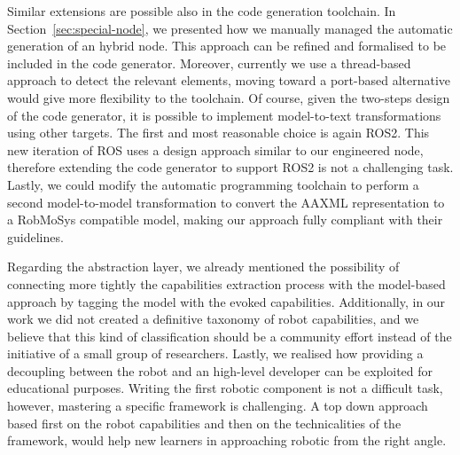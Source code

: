Similar extensions are possible also in the code generation toolchain. In Section~\ref{sec:special-node}, we presented how we manually managed the automatic generation of an hybrid node. This approach can be refined and formalised to be included in the code generator. Moreover, currently we use a thread-based approach to detect the relevant elements, moving toward a port-based alternative would give more flexibility to the toolchain. Of course, given the two-steps design of the code generator, it is possible to implement model-to-text transformations using other targets. The first and most reasonable choice is again ROS2. This new iteration of ROS uses a design approach similar to our engineered node, therefore extending the code generator to support ROS2 is not a challenging task. Lastly, we could modify the automatic programming toolchain to perform a second model-to-model transformation to convert the AAXML representation to a RobMoSys compatible model, making our approach fully compliant with their guidelines.

Regarding the abstraction layer, we already mentioned the possibility of connecting more tightly the capabilities extraction process with the model-based approach by tagging the model with the evoked capabilities. Additionally, in our work we did not created a definitive taxonomy of robot capabilities, and we believe that this kind of classification should be a community effort instead of the initiative of a small group of researchers. Lastly, we realised how providing a decoupling between the robot and an high-level developer can be exploited for educational purposes. Writing the first robotic component is not a difficult task, however, mastering a specific framework is challenging. A top down approach based first on the robot capabilities and then on the technicalities of the framework, would help new learners in approaching robotic from the right angle. 


